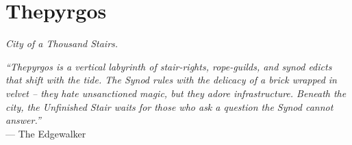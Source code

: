 \documentclass[12pt,oneside]{book}
\begin{document}


\newpage

\chapter{Thepyrgos}
\emph{City of a Thousand Stairs.}

\noindent
\textit{``Thepyrgos is a vertical labyrinth of stair-rights, rope-guilds, and synod edicts that shift with the tide. The Synod rules with the delicacy of a brick wrapped in velvet -- they hate unsanctioned magic, but they adore infrastructure. Beneath the city, the Unfinished Stair waits for those who ask a question the Synod cannot answer.''} \\
--- The Edgewalker
\end{document}
